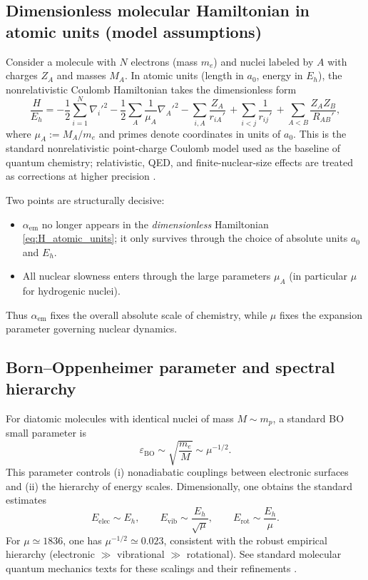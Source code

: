 \subsection{Dimensionless molecular Hamiltonian in atomic units (model assumptions)}
Consider a molecule with $N$ electrons (mass $m_e$) and nuclei labeled by $A$ with charges $Z_A$ and masses $M_A$. In atomic units (length in $a_0$, energy in $E_h$), the nonrelativistic Coulomb Hamiltonian takes the dimensionless form \cite{SzaboOstlund1996}
\begin{equation}\label{eq:H_atomic_units}
\frac{H}{E_h}
=
-\frac12\sum_{i=1}^{N}\nabla_i'^2
-\frac12\sum_A \frac{1}{\mu_A}\nabla_A'^2
-\sum_{i,A}\frac{Z_A}{r_{iA}'}
\,+\sum_{i<j}\frac{1}{r_{ij}'}
\,+\sum_{A<B}\frac{Z_AZ_B}{R_{AB}'},
\end{equation}
where $\mu_A:=M_A/m_e$ and primes denote coordinates in units of $a_0$.
This is the standard nonrelativistic point-charge Coulomb model used as the baseline of quantum chemistry; relativistic, QED, and finite-nuclear-size effects are treated as corrections at higher precision \cite{AtkinsFriedman2011,SzaboOstlund1996}.

Two points are structurally decisive:
\begin{itemize}
\item $\alpha_{\mathrm{em}}$ no longer appears in the \emph{dimensionless} Hamiltonian \eqref{eq:H_atomic_units}; it only survives through the choice of absolute units $a_0$ and $E_h$.
\item All nuclear slowness enters through the large parameters $\mu_A$ (in particular $\mu$ for hydrogenic nuclei).
\end{itemize}
Thus $\alpha_{\mathrm{em}}$ fixes the overall absolute scale of chemistry, while $\mu$ fixes the expansion parameter governing nuclear dynamics.

\subsection{Born--Oppenheimer parameter and spectral hierarchy}
For diatomic molecules with identical nuclei of mass $M\sim m_p$, a standard BO small parameter is
\begin{equation}
\varepsilon_{\mathrm{BO}}\sim \sqrt{\frac{m_e}{M}} \sim \mu^{-1/2}.
\end{equation}
This parameter controls (i) nonadiabatic couplings between electronic surfaces and (ii) the hierarchy of energy scales. Dimensionally, one obtains the standard estimates
\begin{equation}
E_{\mathrm{elec}}\sim E_h,
\qquad
E_{\mathrm{vib}}\sim \frac{E_h}{\sqrt{\mu}},
\qquad
E_{\mathrm{rot}}\sim \frac{E_h}{\mu}.
\end{equation}
For $\mu\simeq 1836$, one has $\mu^{-1/2}\simeq 0.023$, consistent with the robust empirical hierarchy (electronic $\gg$ vibrational $\gg$ rotational).
See standard molecular quantum mechanics texts for these scalings and their refinements \cite{AtkinsFriedman2011,SzaboOstlund1996}.

